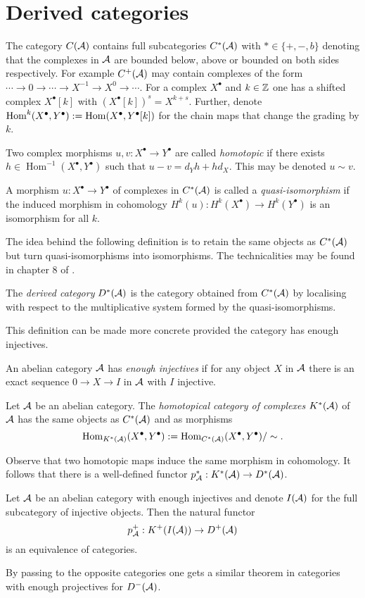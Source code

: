 \section{Derived categories}
The category $C(\AA)$ contains full subcategories $C^*(\AA)$ with $*\in \{ +, -, b\}$ denoting that the complexes in $\AA$ are bounded below, above or bounded on both sides respectively.
For example $C^+(\AA)$ may contain complexes of the form $\cdots \to 0\to \cdots \to X^{-1} \to X^0 \to \cdots$.
For a complex $X^\bullet$ and $k\in \Z$ one has a shifted complex $X^\bullet[k]$ with $(X^\bullet[k])^s = X^{k+s}$.
Further, denote $\operatorname{Hom}^k(X^\bullet, Y^\bullet) :=  \op{Hom}(X^\bullet, Y^\bullet[k])$ for the chain maps that change the grading by $k$.
\begin{definition}
 Two complex morphisms $u,v:X^\bullet\to Y^\bullet$ are called {\it homotopic} if there exists $h\in \operatorname{Hom}^{-1}(X^\bullet, Y^\bullet)$ such that $u-v = d_Y h + hd_X$. This may be denoted $u\sim v$.
\end{definition}
\begin{definition}
 A morphism $u:X^\bullet\to Y^\bullet$  of complexes in $C^*(\AA)$ is called a {\it quasi-isomorphism} if the induced morphism in cohomology $H^k(u):H^k(X^\bullet) \to H^k(Y^\bullet)$ is an isomorphism for all $k$.
\end{definition}
The idea behind the following definition is to retain the same objects as $C^*(\AA)$ but turn quasi-isomorphisms into isomorphisms.
The technicalities may be found in chapter 8 of \cite{deligne1977sga}.
\begin{definition}
  The {\it derived category} $D^*(\AA)$ is the category obtained from $C^*(\AA)$ by localising with respect to the multiplicative system formed by the quasi-isomorphisms.
\end{definition}
This definition can be made more concrete provided the category has enough injectives.
\begin{definition}
 An abelian category $\AA$ has {\it enough injectives} if for any object $X$ in $\AA$ there is an exact sequence $0\to X \to I$ in $\AA$ with $I$ injective.
\end{definition}
\begin{definition}
 Let $\AA$ be an abelian category.
 The {\it homotopical category of complexes} $K^*(\AA)$ of $\AA$ has the same objects as $C^*(\AA)$ and as morphisms
 $$\operatorname{Hom}_{K^*(\AA)}(X^\bullet,Y^\bullet):= \operatorname{Hom}_{C^*(\AA)}(X^\bullet,Y^\bullet)/\sim.$$
\end{definition}
Observe that two homotopic maps induce the same morphism in cohomology.
It follows that there is a well-defined functor $p_\AA^*:K^*(\AA)\to D^*(\AA)$.
\begin{proposition}{\cite[Proposition 1.3.10.]{dimca2004sheaves}}\label{prop: DerivedCategoryInjectives}
 Let $\AA$ be an abelian category with enough injectives and denote $I(\AA)$ for the full subcategory of injective objects.
 Then the natural functor
 $$p_\AA^+: K^+(I(\AA))\to D^+(\AA) $$
 is an equivalence of categories.
\end{proposition}
By passing to the opposite categories one gets a similar theorem in categories with enough projectives for $D^-(\AA)$.
